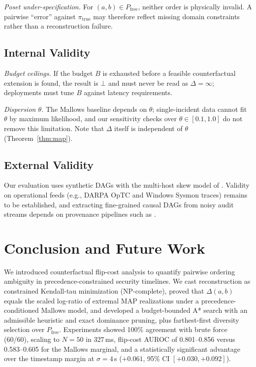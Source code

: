 \documentclass{ieeeaccess}
\newcommand{\Pfree}{P_{\mathrm{free}}}
\begin{document}
\emph{Poset under-specification.} For $(a,b)\in\Pfree$, neither order is physically invalid. A pairwise ``error'' against $\pi_{\mathrm{true}}$ may therefore reflect missing domain constraints rather than a reconstruction failure.

\subsection{Internal Validity}
\emph{Budget ceilings.} If the budget $B$ is exhausted before a feasible counterfactual extension is found, the result is $\bot$ and must never be read as $\Delta=\infty$; deployments must tune $B$ against latency requirements.

\emph{Dispersion $\theta$.} The Mallows baseline depends on $\theta$; single-incident data cannot fit $\theta$ by maximum likelihood, and our sensitivity checks over $\theta\in[0.1,1.0]$ do not remove this limitation. Note that $\Delta$ itself is independent of $\theta$ (Theorem~\ref{thm:map}).

\subsection{External Validity}
Our evaluation uses synthetic DAGs with the multi-host skew model of \cite{Kimm2026}. Validity on operational feeds (e.g., DARPA OpTC and Windows Sysmon traces) remains to be established, and extracting fine-grained causal DAGs from noisy audit streams depends on provenance pipelines such as \cite{Hossain2017,Cheng2024}.

\section{Conclusion and Future Work}\label{sec:conclusion}
We introduced counterfactual flip-cost analysis to quantify pairwise ordering ambiguity in precedence-constrained security timelines. We cast reconstruction as constrained Kendall-tau minimization (NP-complete), proved that $\Delta(a,b)$ equals the scaled log-ratio of extremal MAP realizations under a precedence-conditioned Mallows model, and developed a budget-bounded A* search with an admissible heuristic and exact dominance pruning, plus farthest-first diversity selection over $\Pfree$. Experiments showed 100\% agreement with brute force (60/60), scaling to $N=50$ in 327\,ms, flip-cost AUROC of 0.801--0.856 versus 0.583--0.605 for the Mallows marginal, and a statistically significant advantage over the timestamp margin at $\sigma=4$\,s ($+0.061$, 95\% CI $[+0.030,+0.092]$).
\end{document}
